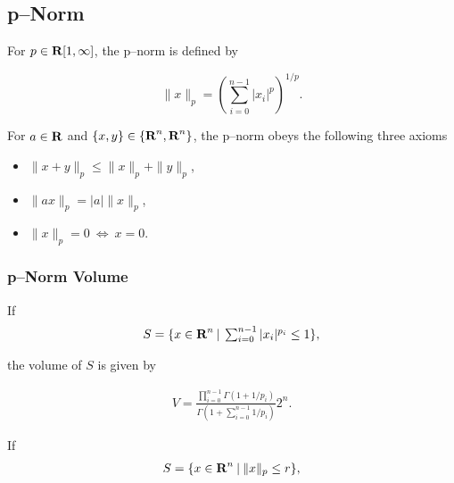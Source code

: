 \documentclass{article}
\begin{document}
        \clearpage

        \subsection{p--Norm}\label{sec:p_norm}
        For $p\in\textbf{R}[1,\infty]$, the p--norm is defined by 

        $$\|x\|_p=\left(\textstyle\sum_{i=0}^{n-1}|x_i|^p\right)^{1/p}.$$

        For $a\in\textbf{R}$ and $\{x,y\}\in\{\textbf{R}^n,\textbf{R}^n\}$, 
        the p--norm obeys the following three axioms 
        \begin{itemize}
            \item $\|x+y\|_p\leq \|x\|_p+\|y\|_p$,
            \item $\|ax\|_p=|a|\|x\|_p$,
            \item $\|x\|_p=0\:\Leftrightarrow\:x=0$.
        \end{itemize}
        
        \note{If $p\in\R[0,1)$, $\|x\|_p$ does not satisfy the norm axioms.}



        \subsubsection{p--Norm Volume}
        If 
        \begin{align*}
            S=\{x\in\textbf{R}^n\:|\:\textstyle\sum_{i=0}^{n-1}|x_i|^{p_i}\leq 1\},
        \end{align*}

        the volume of $S$ is given by \cite[p.~164]{Dirichlet}

        \begin{align*}
            V = \frac{\textstyle\prod_{i=0}^{n-1}\Gamma(1+1/p_i)}{\Gamma(1+\textstyle\sum_{i=0}^{n-1}1/p_i)}2^n.
        \end{align*}

        If 
        \begin{align*}
            S=\{x\in\textbf{R}^n\:|\:\|x\|_p\leq r\},
        \end{align*}
\end{document}
